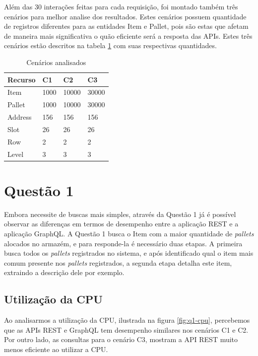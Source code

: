 Além das 30 interações feitas para cada requisição, foi montado também três cenários para melhor analise dos resultados. Estes cenários possuem quantidade de registros diferentes para as entidades \textup{Item} e \textup{Pallet}, pois são estas que afetam de maneira mais significativa o quão eficiente será a resposta das APIs. Estes três cenários estão descritos na tabela \ref{tab:cenarios} com suas respectivas quantidades.

\begin{table}[htbp]
    \centering
    \begin{tabular}{| l | l | l | l|}
        \hline
        \textbf{Recurso} & \textbf{C1} & \textbf{C2} & \textbf{C3} \\ \hline
        Item & 1000 & 10000 & 30000 \\ \hline
        Pallet & 1000 & 10000 & 30000 \\ \hline
        Address & 156 & 156 & 156 \\ \hline
        Slot & 26 & 26 & 26 \\ \hline
        Row & 2 & 2 & 2 \\ \hline
        Level & 3 & 3 & 3 \\ \hline
    \end{tabular}
    \caption{Cenários analisados} 
    \label{tab:cenarios}
\end{table}

\section{Questão 1}

Embora necessite de buscas mais simples, através da Questão 1 já é possível observar as diferenças em termos de desempenho entre a aplicação REST e a aplicação GraphQL. A Questão 1 busca o Item com a maior quantidade de \textit{pallets} alocados no armazém, e para responde-la é necessário duas etapas. A primeira busca todos os \textit{pallets} registrados no sistema, e após identificado qual o item mais comum presente nos \textit{pallets} registrados, a segunda etapa detalha este item, extraindo a descrição dele por exemplo.

\subsection{Utilização da CPU}

Ao analisarmos a utilização da CPU, ilustrada na figura \ref{fig:q1-cpu}, percebemos que as APIs REST e GraphQL tem desempenho similares nos cenários C1 e C2. Por outro lado, as consultas para o cenário C3, mostram a API REST muito menos eficiente ao utilizar a CPU.

